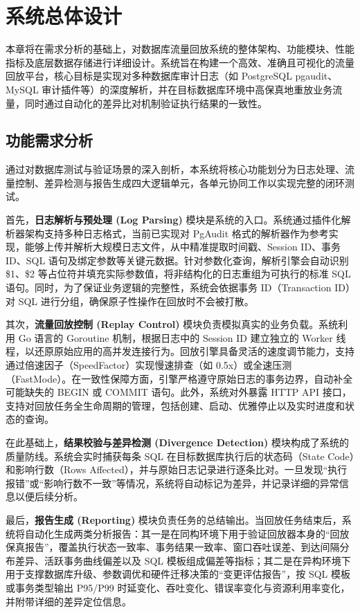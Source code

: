 \newpage
\setcounter{table}{0}
\setcounter{figure}{0}
\section{系统总体设计}

本章将在需求分析的基础上，对数据库流量回放系统的整体架构、功能模块、性能指标及底层数据存储进行详细设计。系统旨在构建一个高效、准确且可视化的流量回放平台，核心目标是实现对多种数据库审计日志（如 PostgreSQL pgaudit、MySQL 审计插件等）的深度解析，并在目标数据库环境中高保真地重放业务流量，同时通过自动化的差异比对机制验证执行结果的一致性。

\subsection{功能需求分析}

通过对数据库测试与验证场景的深入剖析，本系统将核心功能划分为日志处理、流量控制、差异检测与报告生成四大逻辑单元，各单元协同工作以实现完整的闭环测试。

首先，\textbf{日志解析与预处理 (Log Parsing)} 模块是系统的入口。系统通过插件化解析器架构支持多种日志格式，当前已实现对 PgAudit 格式的解析器作为参考实现，能够上传并解析大规模日志文件，从中精准提取时间戳、Session ID、事务 ID、SQL 语句及绑定参数等关键元数据。针对参数化查询，解析引擎会自动识别 \$1、\$2 等占位符并填充实际参数值，将非结构化的日志重组为可执行的标准 SQL 语句。同时，为了保证业务逻辑的完整性，系统会依据事务 ID（Transaction ID）对 SQL 进行分组，确保原子性操作在回放时不会被打散。

其次，\textbf{流量回放控制 (Replay Control)} 模块负责模拟真实的业务负载。系统利用 Go 语言的 Goroutine 机制，根据日志中的 Session ID 建立独立的 Worker 线程，以还原原始应用的高并发连接行为。回放引擎具备灵活的速度调节能力，支持通过倍速因子（SpeedFactor）实现慢速排查（如 0.5x）或全速压测（FastMode）。在一致性保障方面，引擎严格遵守原始日志的事务边界，自动补全可能缺失的 BEGIN 或 COMMIT 语句。此外，系统对外暴露 HTTP API 接口，支持对回放任务全生命周期的管理，包括创建、启动、优雅停止以及实时进度和状态的查询。

在此基础上，\textbf{结果校验与差异检测 (Divergence Detection)} 模块构成了系统的质量防线。系统会实时捕获每条 SQL 在目标数据库执行后的状态码（State Code）和影响行数（Rows Affected），并与原始日志记录进行逐条比对。一旦发现“执行报错”或“影响行数不一致”等情况，系统将自动标记为差异，并记录详细的异常信息以便后续分析。

最后，\textbf{报告生成 (Reporting)} 模块负责任务的总结输出。当回放任务结束后，系统将自动化生成两类分析报告：其一是在同构环境下用于验证回放器本身的“回放保真报告”，覆盖执行状态一致率、事务结果一致率、窗口吞吐误差、到达间隔分布差异、活跃事务曲线偏差以及 SQL 模板组成偏差等指标；其二是在异构环境下用于支撑数据库升级、参数调优和硬件迁移决策的“变更评估报告”，按 SQL 模板或事务类型输出 P95/P99 时延变化、吞吐变化、错误率变化与资源利用率变化，并附带详细的差异定位信息。


